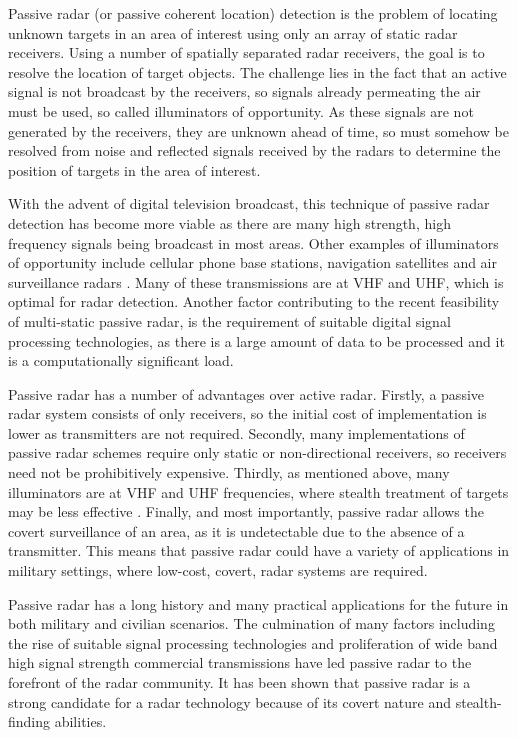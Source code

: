 \documentclass[12pt,openany,a4paper]{book}
\begin{document}
Passive radar (or passive coherent location) detection is the problem of locating unknown targets in an area of interest using only an array of static radar receivers. Using a number of spatially separated radar receivers, the goal is to resolve the location of target objects. The challenge lies in the fact that an active signal is not broadcast by the receivers, so signals already permeating the air must be used, so called illuminators of opportunity. As these signals are not generated by the receivers, they are unknown ahead of time, so must somehow be resolved from noise and reflected signals received by the radars to determine the position of targets in the area of interest.

\bigskip

With the advent of digital television broadcast, this technique of passive radar detection has become more viable as there are many high strength, high frequency signals being broadcast in most areas. Other examples of illuminators of opportunity include cellular phone base stations, navigation satellites and air surveillance radars \cite{Willis1}. Many of these transmissions are at VHF and UHF, which is optimal for radar detection. Another factor contributing to the recent feasibility of multi-static passive radar, is the requirement of suitable digital signal processing technologies, as there is a large amount of data to be processed and it is a computationally significant load. 

\bigskip

Passive radar has a number of advantages over active radar. Firstly, a passive radar system consists of only receivers, so the initial cost of implementation is lower as transmitters are not required. Secondly, many implementations of passive radar schemes require only static or non-directional receivers, so receivers need not be prohibitively expensive. Thirdly, as mentioned above, many illuminators are at VHF and UHF frequencies, where stealth treatment of targets may be less effective \cite{HK2}. Finally, and most importantly, passive radar allows the covert surveillance of an area, as it is undetectable due to the absence of a transmitter. This means that passive radar could have a variety of applications in military settings, where low-cost, covert, radar systems are required.

\bigskip

Passive radar has a long history and many practical applications for the future in both military and civilian scenarios. The culmination of many factors including the rise of suitable signal processing technologies and proliferation of wide band high signal strength commercial transmissions have led passive radar to the forefront of the radar community. It has been shown that passive radar is a strong candidate for a radar technology because of its covert nature and stealth-finding abilities. 
\end{document}
